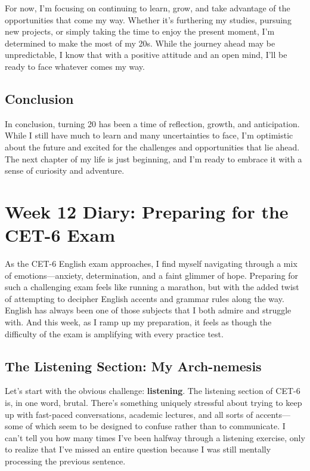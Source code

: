 \documentclass[a4paper]{article} 	%
\begin{document}
For now, I’m focusing on continuing to learn, grow, and take advantage of the opportunities that come my way. Whether it’s furthering my studies, pursuing new projects, or simply taking the time to enjoy the present moment, I’m determined to make the most of my 20s. While the journey ahead may be unpredictable, I know that with a positive attitude and an open mind, I’ll be ready to face whatever comes my way.

\subsection*{Conclusion}

In conclusion, turning 20 has been a time of reflection, growth, and anticipation. While I still have much to learn and many uncertainties to face, I’m optimistic about the future and excited for the challenges and opportunities that lie ahead. The next chapter of my life is just beginning, and I’m ready to embrace it with a sense of curiosity and adventure.

\section{Week 12 Diary: Preparing for the CET-6 Exam}

As the CET-6 English exam approaches, I find myself navigating through a mix of emotions—anxiety, determination, and a faint glimmer of hope. Preparing for such a challenging exam feels like running a marathon, but with the added twist of attempting to decipher English accents and grammar rules along the way. English has always been one of those subjects that I both admire and struggle with. And this week, as I ramp up my preparation, it feels as though the difficulty of the exam is amplifying with every practice test.

\subsection*{The Listening Section: My Arch-nemesis}

Let’s start with the obvious challenge: \textbf{listening}. The listening section of CET-6 is, in one word, brutal. There’s something uniquely stressful about trying to keep up with fast-paced conversations, academic lectures, and all sorts of accents—some of which seem to be designed to confuse rather than to communicate. I can’t tell you how many times I’ve been halfway through a listening exercise, only to realize that I’ve missed an entire question because I was still mentally processing the previous sentence.
\end{document}
